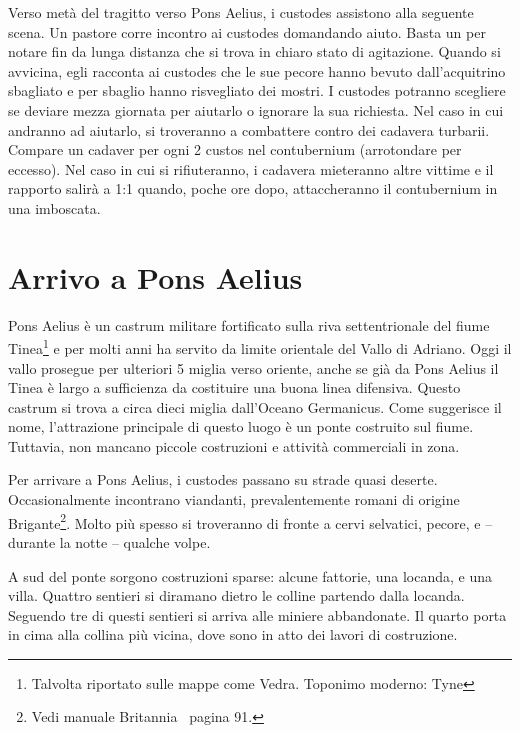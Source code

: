 \documentclass[11.5pt,twocolumn]{article}
\begin{document}
Verso met\`{a} del tragitto verso Pons Aelius, i custodes assistono alla seguente scena.
Un pastore corre incontro ai custodes domandando aiuto.
Basta un  per notare fin da lunga distanza che si trova in chiaro stato di agitazione.
Quando si avvicina, egli racconta ai custodes che le sue pecore hanno bevuto dall'acquitrino sbagliato e per sbaglio hanno risvegliato dei mostri.
I custodes potranno scegliere se deviare mezza giornata per aiutarlo o ignorare la sua richiesta.
Nel caso in cui andranno ad aiutarlo, si troveranno a combattere contro dei cadavera turbarii.
Compare un cadaver per ogni 2 custos nel contubernium (arrotondare per eccesso).
Nel caso in cui si rifiuteranno, i cadavera mieteranno altre vittime e il rapporto salir\`{a} a 1:1 quando, poche ore dopo, attaccheranno il contubernium in una imboscata.

\section{Arrivo a Pons Aelius}
%
Pons Aelius \`{e} un castrum militare fortificato sulla riva settentrionale del fiume Tinea\footnote{Talvolta riportato sulle mappe come Vedra. Toponimo moderno: Tyne} e per molti anni ha servito da limite orientale del Vallo di Adriano.
Oggi il vallo prosegue per ulteriori 5 miglia verso oriente, anche se gi\`{a} da Pons Aelius il Tinea \`{e} largo a sufficienza da costituire una buona linea difensiva.
Questo castrum si trova a circa dieci miglia dall'Oceano Germanicus.
Come suggerisce il nome, l'attrazione principale di questo luogo \`{e} un ponte costruito sul fiume.
Tuttavia, non mancano piccole costruzioni e attivit\`{a} commerciali in zona.

Per arrivare a Pons Aelius, i custodes passano su strade quasi deserte.
Occasionalmente incontrano viandanti, prevalentemente romani di origine Brigante\footnote{Vedi manuale Britannia~\cite{britannia_en} pagina 91.}.
Molto pi\`{u} spesso si troveranno di fronte a cervi selvatici, pecore, e -- durante la notte -- qualche volpe.

A sud del ponte sorgono costruzioni sparse: alcune fattorie, una locanda, e una villa.
Quattro sentieri si diramano dietro le colline partendo dalla locanda.
Seguendo tre di questi sentieri si arriva alle miniere abbandonate.
Il quarto porta in cima alla collina pi\`{u} vicina, dove sono in atto dei lavori di costruzione.
\end{document}
